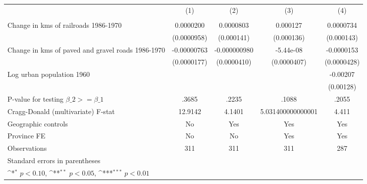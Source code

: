 {
\def\sym#1{\ifmmode^{#1}\else\(^{#1}\)\fi}
\begin{tabular}{l*{4}{c}}
\hline\hline
                &\multicolumn{1}{c}{(1)}&\multicolumn{1}{c}{(2)}&\multicolumn{1}{c}{(3)}&\multicolumn{1}{c}{(4)}\\
                &\multicolumn{1}{c}{}&\multicolumn{1}{c}{}&\multicolumn{1}{c}{}&\multicolumn{1}{c}{}\\
\hline
Change in kms of railroads 1986-1970&0.0000200         &0.0000803         & 0.000127         &0.0000734         \\
                &(0.0000958)         &(0.000141)         &(0.000136)         &(0.000143)         \\
[1em]
Change in kms of paved and gravel roads 1986-1970&-0.00000763         &-0.000000980         &-5.44e-08         &-0.0000153         \\
                &(0.0000177)         &(0.0000410)         &(0.0000407)         &(0.0000428)         \\
[1em]
Log urban population 1960&                  &                  &                  & -0.00207         \\
                &                  &                  &                  &(0.00128)         \\
\hline
P-value for testing $\beta\_{2} >= \beta\_{1}$&    .3685         &    .2235         &    .1088         &    .2055         \\
Cragg-Donald (multivariate) F-stat&  12.9142         &   4.1401         &5.031400000000001         &    4.411         \\
Geographic controls&       No         &      Yes         &      Yes         &      Yes         \\
Province FE     &       No         &       No         &      Yes         &      Yes         \\
Observations    &      311         &      311         &      311         &      287         \\
\hline\hline
\multicolumn{5}{l}{\footnotesize Standard errors in parentheses}\\
\multicolumn{5}{l}{\footnotesize \sym{*} \(p<0.10\), \sym{**} \(p<0.05\), \sym{***} \(p<0.01\)}\\
\end{tabular}
}
